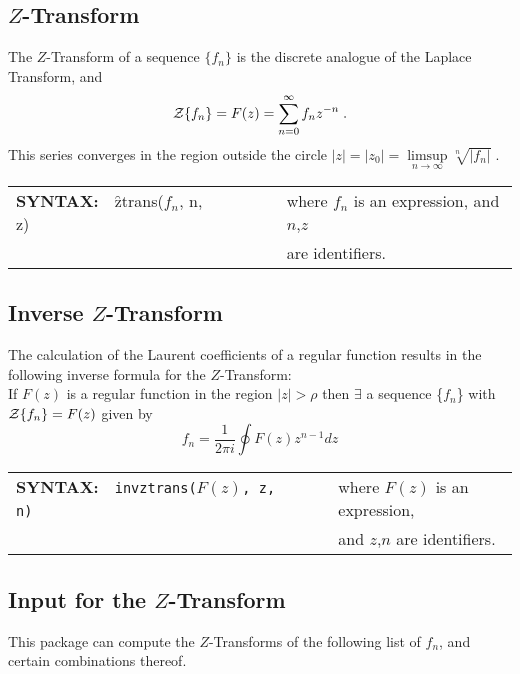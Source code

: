 

\subsection[Z-Transform]{$Z$-Transform}
\hypertarget{operator:ZTRANS}{}
  The $Z$-Transform of a sequence $\{f_n\}$ is the discrete analogue
  of the Laplace Transform, and
  \[{\cal Z}\{f_n\} = F(z) = \sum^\infty_{n=0} f_nz^{-n}\;.\]
  This series converges in the region outside the circle
  $|z|=|z_0|= \limsup\limits_{n \rightarrow \infty} \sqrt[n]{|f_n|}\;.$


\begin{tabular}{@{}l@{}l}
  {\bf SYNTAX:}\ \ {\f{ztrans}($f_n$, n,  z)}\ \ \ \ \ \ \ \
  & where $f_n$ is an expression, and $n$,$z$ \\
  & are identifiers.
\end{tabular}


\subsection[Inverse Z-Transform]{Inverse $Z$-Transform}
\hypertarget{operator:INVZTRANS}{}
  The calculation of the Laurent coefficients of a regular function
  results in the following inverse formula for the $Z$-Transform:
  \\
  If $F(z)$ is a regular function in the region $|z|> \rho$ then
  $\exists$ a sequence \{$f_n$\} with ${\cal Z} \{f_n\}=F(z)$
  given by
  \[f_n = \frac{1}{2 \pi i}\oint F(z) z^{n-1} dz\]


\begin{tabular}{@{}l@{}l}
  {\bf SYNTAX:}\ \ {\tt invztrans($F(z)$, z,  n)}\ \ \ \ \ \ \ \
  & where $F(z)$ is an expression, \\
  & and $z$,$n$ are identifiers.
\end{tabular}


\subsection[Input for the Z-Transform]{Input for the $Z$-Transform}

This package can compute the $Z$-Transforms of the following
list of $f_n$, and certain combinations thereof.

